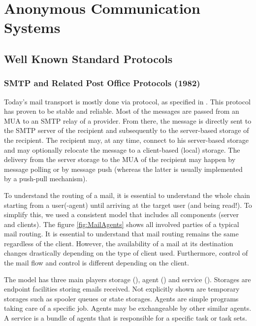 
\part{Anonymous Communication Systems}

\chapter{Well Known Standard Protocols}
\section{SMTP and Related Post Office Protocols (1982)}
Today's mail transport is mostly done via  protocol, as specified in \cite{RFC5321}. This protocol has proven to be stable and reliable. Most of the messages are passed from an MUA to an SMTP relay of a provider. From there, the message is directly sent to the SMTP server of the recipient and subsequently to the server-based storage of the recipient. The recipient may, at any time, connect to his server-based storage and may optionally relocate the message to a client-based (local) storage. The delivery from the server storage to the MUA of the recipient may happen by message polling or by message push (whereas the latter is usually implemented by a push-pull mechanism).

To understand the routing of a mail, it is essential to understand the whole chain starting from a user(-agent) until arriving at the target user (and being read!). To simplify this, we used a consistent model that includes all components (server and clients). The figure \ref{fig:MailAgents} shows all involved parties of a typical mail routing. It is essential to understand that mail routing remains the same regardless of the client. However, the availability of a mail at its destination changes drastically depending on the type of client used. Furthermore, control of the mail flow and control is different depending on the client.

The model has three main players storage (), agent () and service (). Storages are endpoint facilities storing emails received. Not explicitly shown are temporary storages such as spooler queues or state storages. Agents are simple programs taking care of a specific job. Agents may be exchangeable by other similar agents. A service is a bundle of agents that is responsible for a specific task or task sets.

